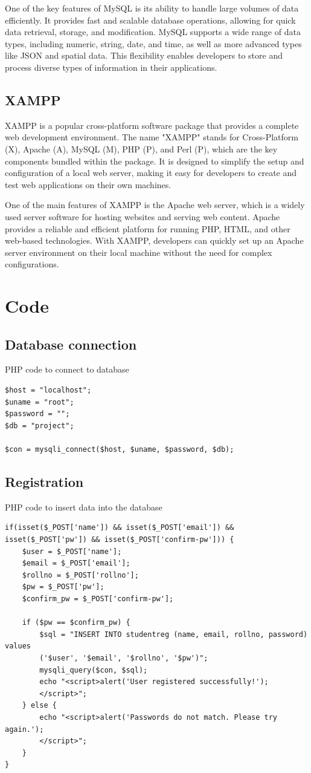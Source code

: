 \documentclass[a4paper,11pt]{report}
\begin{document}
One of the key features of MySQL is its ability to handle large volumes of data efficiently. It provides fast and scalable database operations, allowing for quick data retrieval, storage, and modification. MySQL supports a wide range of data types, including numeric, string, date, and time, as well as more advanced types like JSON and spatial data. This flexibility enables developers to store and process diverse types of information in their applications.

\section{XAMPP}
XAMPP is a popular cross-platform software package that provides a complete web development environment. The name "XAMPP" stands for Cross-Platform (X), Apache (A), MySQL (M), PHP (P), and Perl (P), which are the key components bundled within the package. It is designed to simplify the setup and configuration of a local web server, making it easy for developers to create and test web applications on their own machines.

One of the main features of XAMPP is the Apache web server, which is a widely used server software for hosting websites and serving web content. Apache provides a reliable and efficient platform for running PHP, HTML, and other web-based technologies. With XAMPP, developers can quickly set up an Apache server environment on their local machine without the need for complex configurations.

\chapter{Code}
\section{Database connection}
PHP code to connect to database
\begin{verbatim}
$host = "localhost";
$uname = "root";
$password = "";
$db = "project";

$con = mysqli_connect($host, $uname, $password, $db);
\end{verbatim}

\section{Registration}
PHP code to insert data into the database

\begin{verbatim}
if(isset($_POST['name']) && isset($_POST['email']) &&
isset($_POST['pw']) && isset($_POST['confirm-pw'])) {
	$user = $_POST['name'];
	$email = $_POST['email'];
    $rollno = $_POST['rollno'];
	$pw = $_POST['pw'];
	$confirm_pw = $_POST['confirm-pw'];

	if ($pw == $confirm_pw) {
		$sql = "INSERT INTO studentreg (name, email, rollno, password) values 
		('$user', '$email', '$rollno', '$pw')";
		mysqli_query($con, $sql);
		echo "<script>alert('User registered successfully!');
		</script>";
	} else {
		echo "<script>alert('Passwords do not match. Please try again.');
		</script>";
	}
}
\end{verbatim}
\end{document}
